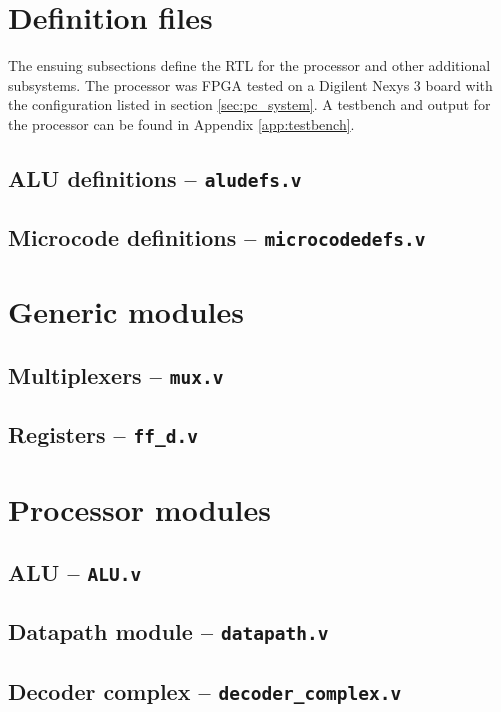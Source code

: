 \label{sec:rtl}
\section{Definition files}
The ensuing subsections define the RTL for the processor and other additional
subsystems. The processor was FPGA tested on a Digilent Nexys 3 board with the
configuration listed in section \ref{sec:pc_system}. A testbench and output for
the processor can be found in Appendix \ref{app:testbench}.
\subsection{ALU definitions -- \texttt{aludefs.v}}

\subsection{Microcode definitions -- \texttt{microcodedefs.v}}

\section{Generic modules}
\subsection{Multiplexers -- \texttt{mux.v}}

\subsection{Registers -- \texttt{ff\_d.v}}

\section{Processor modules}
\subsection{ALU -- \texttt{ALU.v}}

\subsection{Datapath module -- \texttt{datapath.v}}

\subsection{Decoder complex -- \texttt{decoder\_complex.v}}

